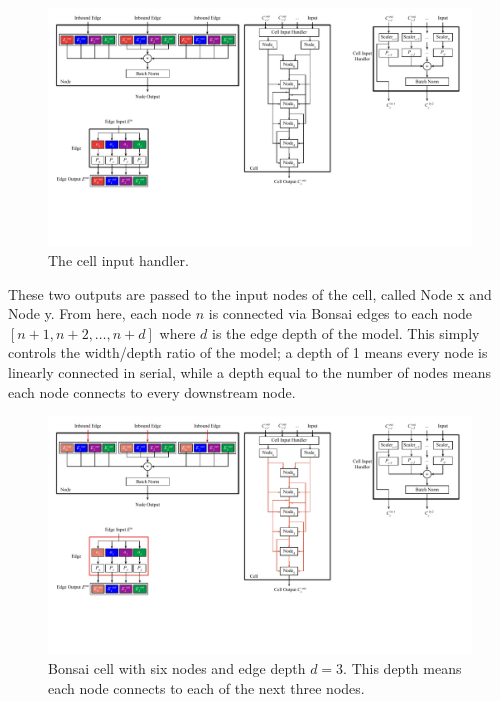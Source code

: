 \begin{figure}[ht]
	\centering
	\hspace*{-1cm}\includegraphics[width=.42\textwidth]{input_handler}
	\caption[The cell input handler]{The cell input handler.}
	\label{fig:bonsai_ih}
\end{figure}
These two outputs are
passed to the input nodes of the cell, called Node x and Node y. From here, each node $n$ is connected via Bonsai
edges to each node $[n+1, n+2, \dots, n+d]$ where $d$ is the edge depth of the model. This simply controls the width/depth
ratio of the model; a depth of 1 means every node is linearly connected in serial, while a depth equal to the number of
nodes means each node connects to every downstream node.
\begin{figure}[t!]
	\centering
	\includegraphics[width=.7\textwidth]{cell}
	\caption[Bonsai cell with six nodes and edge depth $d=3$]{Bonsai cell with six nodes and edge depth $d=3$. This depth means each node connects to each of the next
	three nodes.}
	\label{fig:bonsai_cell}
\end{figure}

\clearpage

